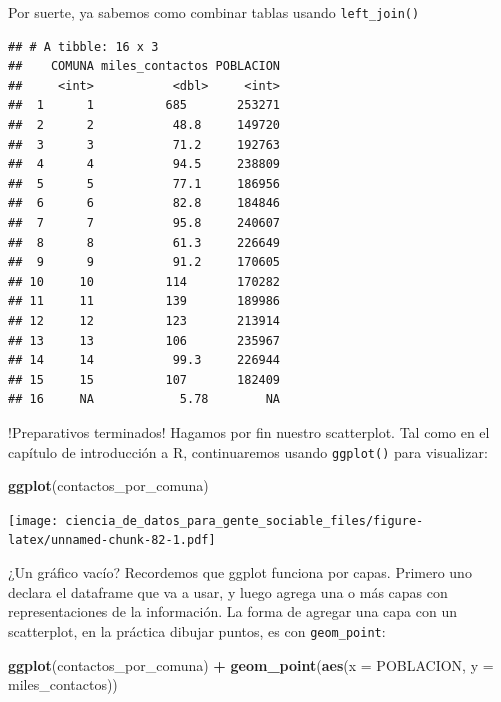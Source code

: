 \documentclass[]{book}
\newenvironment{Shaded}{\begin{snugshade}}{\end{snugshade}}
\newcommand{\KeywordTok}[1]{\textcolor[rgb]{0.13,0.29,0.53}{\textbf{#1}}}
\newcommand{\DataTypeTok}[1]{\textcolor[rgb]{0.13,0.29,0.53}{#1}}
\newcommand{\StringTok}[1]{\textcolor[rgb]{0.31,0.60,0.02}{#1}}
\newcommand{\OperatorTok}[1]{\textcolor[rgb]{0.81,0.36,0.00}{\textbf{#1}}}
\newcommand{\NormalTok}[1]{#1}
\begin{document}
Por suerte, ya sabemos como combinar tablas usando \texttt{left\_join()}

\begin{Shaded}
\end{Shaded}

\begin{verbatim}
## # A tibble: 16 x 3
##    COMUNA miles_contactos POBLACION
##     <int>           <dbl>     <int>
##  1      1          685       253271
##  2      2           48.8     149720
##  3      3           71.2     192763
##  4      4           94.5     238809
##  5      5           77.1     186956
##  6      6           82.8     184846
##  7      7           95.8     240607
##  8      8           61.3     226649
##  9      9           91.2     170605
## 10     10          114       170282
## 11     11          139       189986
## 12     12          123       213914
## 13     13          106       235967
## 14     14           99.3     226944
## 15     15          107       182409
## 16     NA            5.78        NA
\end{verbatim}

!Preparativos terminados! Hagamos por fin nuestro scatterplot. Tal como
en el capítulo de introducción a R, continuaremos usando
\texttt{ggplot()} para visualizar:

\begin{Shaded}
\begin{Highlighting}[]
\KeywordTok{ggplot}\NormalTok{(contactos_por_comuna)}
\end{Highlighting}
\end{Shaded}

\texttt{[image: ciencia\_de\_datos\_para\_gente\_sociable\_files/figure-latex/unnamed-chunk-82-1.pdf]}

¿Un gráfico vacío? Recordemos que ggplot funciona por capas. Primero uno
declara el dataframe que va a usar, y luego agrega una o más capas con
representaciones de la información. La forma de agregar una capa con un
scatterplot, en la práctica dibujar puntos, es con \texttt{geom\_point}:

\begin{Shaded}
\begin{Highlighting}[]
\KeywordTok{ggplot}\NormalTok{(contactos_por_comuna) }\OperatorTok{+}\StringTok{ }\KeywordTok{geom_point}\NormalTok{(}\KeywordTok{aes}\NormalTok{(}\DataTypeTok{x =}\NormalTok{ POBLACION, }\DataTypeTok{y =}\NormalTok{ miles_contactos))}
\end{Highlighting}
\end{Shaded}
\end{document}
